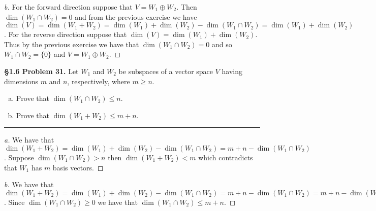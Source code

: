 \documentclass[leqno]{article}
\theoremstyle{nonumberplain}
\newtheorem{proof}{Proof}
\begin{document}
\begin{proof}[b]
For the forward direction suppose that $V=W_1\oplus W_2$. Then $\dim(W_1\cap W_2)=0$ and from the previous exercise we have $\dim(V)=\dim(W_1+W_2)=\dim(W_1)+\dim(W_2)-\dim(W_1\cap W_2)=\dim(W_1)+\dim(W_2)$. For the reverse direction suppose that $\dim(V)=\dim(W_1)+\dim(W_2)$.  Thus by the previous exercise we have that $\dim(W_1 \cap W_2)=0$ and so $W_1\cap W_2=\{0\}$ and $V=W_1\oplus W_2$.
\end{proof}
\pagebreak




\noindent\textbf{\S 1.6 Problem 31.} Let $W_1$ and $W_2$ be subspaces of a vector space $V$ having dimensions $m$ and $n$, respectively, where $m\geq n$.
\begin{enumerate}[(a)]
\item Prove that $\dim(W_1\cap W_2) \leq n$.
\item Prove that $\dim(W_1+W_2)\leq m+n$.
\end{enumerate}

\noindent\rule[0.5ex]{\linewidth}{1pt}

\begin{proof}[a]
We have that $\dim(W_1+W_2)=\dim(W_1)+\dim(W_2)-\dim(W_1\cap W_2)=m+n-\dim(W_1\cap W_2)$.  Suppose $\dim(W_1\cap W_2)>n$ then $\dim(W_1+W_2)<m$ which contradicts that $W_1$ has $m$ basis vectors. 
\end{proof}
\begin{proof}[b]
We have that $\dim(W_1+W_2)=\dim(W_1)+\dim(W_2)-\dim(W_1\cap W_2)=m+n-\dim(W_1\cap W_2)=m+n-\dim(W_1\cap W_2)$.  Since $\dim(W_1\cap W_2)\geq 0$ we have that $\dim(W_1\cap W_2)\leq m+n$.
\end{proof}
\pagebreak
\end{document}
